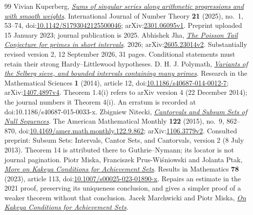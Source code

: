 \documentclass[11pt]{article}
\begin{document}
\begin{thebibliography}{99}
 Vivian Kuperberg, \href{https://arxiv.org/abs/2301.06095v1}{\emph{Sums of singular series along arithmetic progressions and with smooth weights}}.
  International Journal of Number Theory \textbf{21} (2025), no.~1, 53--74, doi:\href{https://doi.org/10.1142/S1793042125500046}{10.1142/S1793042125500046}; arXiv:\href{https://arxiv.org/abs/2301.06095v1}{2301.06095v1}. Preprint uploaded 15 January 2023; journal publication is 2025.
 Abhishek Jha, \href{https://arxiv.org/abs/2605.23014v2}{\emph{The Poisson Tail Conjecture for primes in short intervals}}.
  2026; arXiv:\href{https://arxiv.org/abs/2605.23014v2}{2605.23014v2}. Substantially revised version 2, 12 September 2026, 31 pages. Conditional statements must retain their strong Hardy--Littlewood hypotheses.
 {D. H. J. Polymath}, \href{https://arxiv.org/abs/1407.4897v4}{\emph{Variants of the Selberg sieve, and bounded intervals containing many primes}}.
  Research in the Mathematical Sciences \textbf{1} (2014), article 12, doi:\href{https://doi.org/10.1186/s40687-014-0012-7}{10.1186/s40687-014-0012-7}; arXiv:\href{https://arxiv.org/abs/1407.4897v4}{1407.4897v4}. Theorem 1.4(i) refers to arXiv version 4 (22 December 2014); the journal numbers it Theorem 4(i). An erratum is recorded at doi:10.1186/s40687-015-0033-x.
 Zbigniew Nitecki, \href{https://arxiv.org/abs/1106.3779v2}{\emph{Cantorvals and Subsum Sets of Null Sequences}}.
  The American Mathematical Monthly \textbf{122} (2015), no.~9, 862--870, doi:\href{https://doi.org/10.4169/amer.math.monthly.122.9.862}{10.4169/amer.math.monthly.122.9.862}; arXiv:\href{https://arxiv.org/abs/1106.3779v2}{1106.3779v2}. Consulted preprint: Subsum Sets: Intervals, Cantor Sets, and Cantorvals, version 2 (8 July 2013). Theorem 14 is attributed there to Guthrie--Nymann; its locator is not journal pagination.
 Piotr Miska, Franciszek Prus-Wi\'sniowski and Jolanta Ptak, \href{https://ruj.uj.edu.pl/server/api/core/bitstreams/d6630f7b-e6ee-4de8-8a1b-81c7b4c59d2e/content}{\emph{More on Kakeya Conditions for Achievement Sets}}.
  Results in Mathematics \textbf{78} (2023), article 113, doi:\href{https://doi.org/10.1007/s00025-023-01890-x}{10.1007/s00025-023-01890-x}. Repairs an estimate in the 2021 proof, preserving its uniqueness conclusion, and gives a simpler proof of a weaker theorem without that conclusion.
 Jacek Marchwicki and Piotr Miska, \href{https://link.springer.com/article/10.1007/s00025-021-01479-2}{\emph{On Kakeya Conditions for Achievement Sets}}.

\end{thebibliography}
\end{document}
